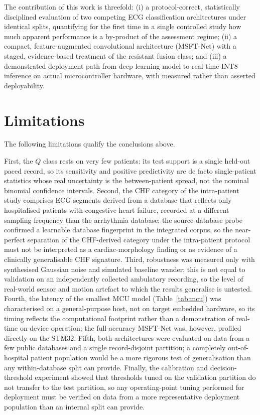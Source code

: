 The contribution of this work is threefold: (i) a protocol-correct,
statistically disciplined evaluation of two competing ECG classification
architectures under identical splits, quantifying for the first time in a
single controlled study how much apparent performance is a by-product of
the assessment regime; (ii) a compact, feature-augmented convolutional
architecture (MSFT-Net) with a staged, evidence-based treatment of the
resistant fusion class; and (iii) a demonstrated deployment path from
deep learning model to real-time INT8 inference on actual
microcontroller hardware, with measured rather than asserted
deployability.


\section{Limitations}
\label{sec:limitations}

The following limitations qualify the conclusions above.

First, the $Q$ class rests on very few patients: its test support is a
single held-out paced record, so its sensitivity and positive predictivity
are de facto single-patient statistics whose real uncertainty is the
between-patient spread, not the nominal binomial confidence intervals.
Second, the CHF category of the intra-patient study comprises ECG segments
derived from a database that
reflects only hospitalised patients with congestive heart failure, recorded
at a different sampling frequency than the arrhythmia database; the
source-database probe confirmed a learnable database fingerprint in the
integrated corpus, so the near-perfect separation of the CHF-derived
category under the
intra-patient protocol must not be interpreted as a cardiac-morphology
finding or as evidence of a clinically generalisable CHF signature. Third, robustness was measured only with synthesised Gaussian
noise and simulated baseline wander; this is not equal to validation on an
independently collected ambulatory recording, so the level of real-world
sensor and motion artefact to which the results generalise is untested.
Fourth, the latency of the smallest MCU model (Table~\ref{tab:mcu}) was
characterised on a general-purpose host, not on target embedded hardware,
so its timing reflects the computational footprint rather than a
demonstration of real-time on-device operation; the full-accuracy MSFT-Net
was, however, profiled directly on the STM32. Fifth, both architectures
were evaluated on data from a few public databases and a single
record-disjoint partition; a completely out-of-hospital patient population
would be a more rigorous test of generalisation than any within-database
split can provide. Finally, the calibration and decision-threshold
experiment showed that thresholds tuned on the validation partition do not
transfer to the test partition, so any operating-point tuning performed for
deployment must be verified on data from a more representative deployment
population than an internal split can provide.


